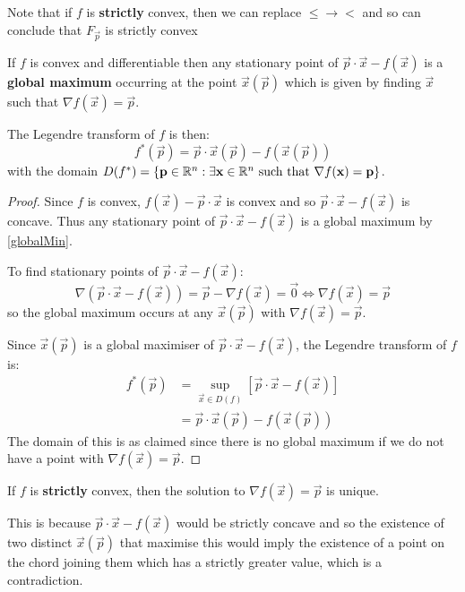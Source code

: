 \documentclass[../main.tex]{subfiles}
\begin{document}
\begin{remark}
  Note that if $f$ is \textbf{strictly} convex, then we can replace $\leq \to <$ and so can conclude that $F_{\vec{p}}$ is strictly convex
\end{remark}
\begin{corollary}
  If $f$ is convex and differentiable then any stationary point of $\vec{p} \cdot \vec{x} - f(\vec{x})$  is a \textbf{global maximum} occurring at the point $\vec{x}(\vec{p})$ which is given by finding $\vec{x}$ such that $\nabla f(\vec{x}) = \vec{p}$. \label{legDiff}

  The Legendre transform of $f$ is then:
  \[
    f^{*}(\vec{p}) = \vec{p} \cdot \vec{x}(\vec{p}) - f(\vec{x}(\vec{p}))
  \]
  with the domain $D(f^{*}) = \{\mathbf{\bm{p}} \in \mathbb{R}^{n}: \exists \mathbf{\bm{x}} \in \mathbb{R}^{n} \text{ such that } \nabla f(\mathbf{\bm{x}}) = \mathbf{\bm{p}}\}$.
\end{corollary}
\begin{proof}
  Since $f$ is convex, $f(\vec{x}) - \vec{p} \cdot \vec{x}$ is convex and so $\vec{p} \cdot \vec{x} - f(\vec{x})$ is concave.
  Thus any stationary point of $\vec{p} \cdot \vec{x} - f(\vec{x})$ is a global maximum by \cref{globalMin}.

  To find stationary points of $\vec{p} \cdot \vec{x} - f(\vec{x})$:
  \[
    \nabla(\vec{p}\cdot \vec{x} - f(\vec{x})) = \vec{p} - \nabla f(\vec{x}) = \vec{0} \iff \nabla f(\vec{x}) = \vec{p}
  \]
  so the global maximum occurs at any $\vec{x}(\vec{p})$ with $\nabla f(\vec{x}) = \vec{p}$.

  Since $\vec{x}(\vec{p})$ is a global maximiser of $\vec{p} \cdot \vec{x} - f(\vec{x})$, the Legendre transform of $f$ is:
  \begin{align*}
    f^{*}(\vec{p}) &= \sup_{\vec{x} \in D(f)} [\vec{p} \cdot \vec{x} - f(\vec{x})] \\
                   &= \vec{p} \cdot \vec{x}(\vec{p}) - f(\vec{x}(\vec{p}))
  \end{align*}
  The domain of this is as claimed since there is no global maximum if we do not have a point with $\nabla f(\vec{x}) = \vec{p}$.
\end{proof}
\begin{remark}
  If $f$ is \textbf{strictly} convex, then the solution to $\nabla f(\vec{x}) = \vec{p}$ is unique.

  This is because $\vec{p} \cdot \vec{x} - f(\vec{x})$ would be strictly concave and so the existence of two distinct $\vec{x}(\vec{p})$ that maximise this would imply the existence of a point on the chord joining them which has a strictly greater value, which is a contradiction.
\end{remark}
\end{document}
